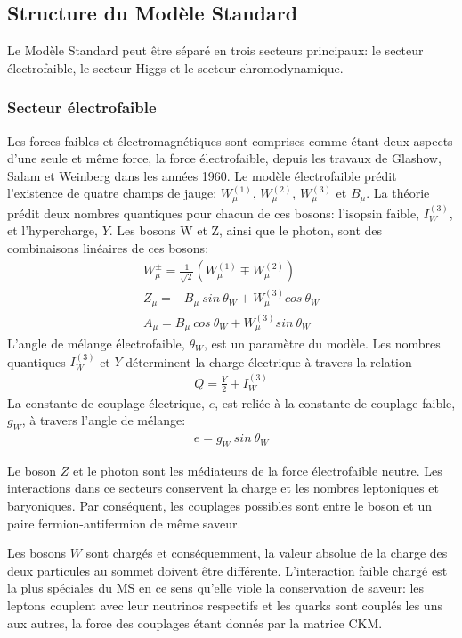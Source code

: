 \subsection{Structure du Modèle Standard}
\label{sec:ms:th:struct}

Le Modèle Standard peut être séparé en trois secteurs principaux: le
secteur électrofaible, le secteur Higgs et le secteur chromodynamique.

\subsubsection{Secteur électrofaible}

Les forces faibles et électromagnétiques sont comprises comme étant
deux aspects d'une seule et même force, la force électrofaible, depuis
les travaux de Glashow, Salam et Weinberg dans les années
1960. Le modèle électrofaible prédit
l'existence de quatre champs de jauge: $W^{(1)}_\mu$, $W^{(2)}_\mu$,
$W^{(3)}_\mu$ et $B_\mu$. La théorie prédit deux nombres quantiques
pour chacun de ces bosons: l'isopsin faible, $I^{(3)}_W$, et
l'hypercharge, $Y$. Les bosons W et Z, ainsi que le photon, sont des
combinaisons linéaires de ces bosons:
\begin{eqnarray}
  \label{eq:ewk_mix}
  W^{\pm}_\mu = \frac{1}{\sqrt{2}}(W^{(1)}_\mu \mp W^{(2)}_\mu)  \\
  Z_\mu = -B_\mu\ sin\ \theta_W + W^{(3)}_\mu cos\ \theta_W \\
  A_\mu = B_\mu\ cos\ \theta_W + W^{(3)}_\mu sin\ \theta_W
\end{eqnarray}
L'angle de mélange électrofaible, $\theta_W$, est un paramètre du
modèle. Les nombres quantiques $I^{(3)}_W$ et $Y$ déterminent la
charge électrique à travers la relation
\begin{eqnarray}
  Q = \frac{Y}{2} + I^{(3)}_W
\end{eqnarray}
La constante de couplage électrique, $e$, est reliée à la constante de
couplage faible, $g_W$, à travers l'angle de mélange:
\begin{eqnarray}
  e = g_W\ sin\ \theta_W
\end{eqnarray}

Le boson $Z$ et le photon sont les médiateurs de la force
électrofaible neutre. Les interactions dans ce secteurs conservent la
charge et les nombres leptoniques et baryoniques. Par conséquent, les
couplages possibles sont entre le boson et un paire
fermion-antifermion de même saveur.

Les bosons $W$ sont chargés et conséquemment, la valeur absolue de la
charge des deux particules au sommet doivent être
différente. L'interaction faible chargé est la plus spéciales du MS en
ce sens qu'elle viole la conservation de saveur: les leptons couplent
avec leur neutrinos respectifs et les quarks sont couplés les uns aux
autres, la force des couplages étant donnés par la matrice CKM.

